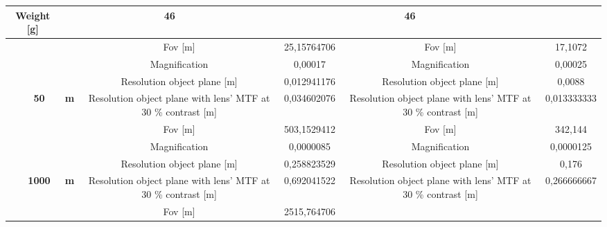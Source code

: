 \begin{table}[H]
{\begin{tabular}{ccc|cc|cc|}
  \multicolumn{2}{c|}{\textbf{Weight {[}g{]}}} &
  \multicolumn{2}{c|}{46} &
  \multicolumn{2}{c|}{46} \\ \hline
\multicolumn{1}{|c|}{} &
  \cellcolor[HTML]{EFEFEF} &
  \cellcolor[HTML]{EFEFEF} &
  \cellcolor[HTML]{EFEFEF}Fov {[}m{]} &
  \cellcolor[HTML]{EFEFEF}25,15764706 &
  \cellcolor[HTML]{EFEFEF}Fov {[}m{]} &
  \cellcolor[HTML]{EFEFEF}17,1072 \\
\multicolumn{1}{|c|}{} &
  \cellcolor[HTML]{EFEFEF} &
  \cellcolor[HTML]{EFEFEF} &
  Magnification &
  0,00017 &
  Magnification &
  0,00025 \\
\multicolumn{1}{|c|}{} &
  \cellcolor[HTML]{EFEFEF} &
  \cellcolor[HTML]{EFEFEF} &
  \cellcolor[HTML]{EFEFEF}Resolution object plane {[}m{]} &
  \cellcolor[HTML]{EFEFEF}0,012941176 &
  \cellcolor[HTML]{EFEFEF}Resolution object plane {[}m{]} &
  \cellcolor[HTML]{EFEFEF}0,0088 \\
\multicolumn{1}{|c|}{} &
  \multirow{-4}{*}{\cellcolor[HTML]{EFEFEF}\textbf{50}} &
  \multirow{-4}{*}{\cellcolor[HTML]{EFEFEF}\textbf{m}} &
  Resolution object plane with lens' MTF at 30 \% contrast {[}m{]} &
  0,034602076 &
  Resolution object plane with lens' MTF at 30 \% contrast {[}m{]} &
  0,013333333 \\ \cline{2-7} 
\multicolumn{1}{|c|}{} &
  \cellcolor[HTML]{EFEFEF} &
  \cellcolor[HTML]{EFEFEF} &
  \cellcolor[HTML]{EFEFEF}Fov {[}m{]} &
  \cellcolor[HTML]{EFEFEF}503,1529412 &
  \cellcolor[HTML]{EFEFEF}Fov {[}m{]} &
  \cellcolor[HTML]{EFEFEF}342,144 \\
\multicolumn{1}{|c|}{} &
  \cellcolor[HTML]{EFEFEF} &
  \cellcolor[HTML]{EFEFEF} &
  Magnification &
  0,0000085 &
  Magnification &
  0,0000125 \\
\multicolumn{1}{|c|}{} &
  \cellcolor[HTML]{EFEFEF} &
  \cellcolor[HTML]{EFEFEF} &
  \cellcolor[HTML]{EFEFEF}Resolution object plane {[}m{]} &
  \cellcolor[HTML]{EFEFEF}0,258823529 &
  \cellcolor[HTML]{EFEFEF}Resolution object plane {[}m{]} &
  \cellcolor[HTML]{EFEFEF}0,176 \\
\multicolumn{1}{|c|}{} &
  \multirow{-4}{*}{\cellcolor[HTML]{EFEFEF}\textbf{1000}} &
  \multirow{-4}{*}{\cellcolor[HTML]{EFEFEF}\textbf{m}} &
  Resolution object plane with lens' MTF at 30 \% contrast {[}m{]} &
  0,692041522 &
  Resolution object plane with lens' MTF at 30 \% contrast {[}m{]} &
  0,266666667 \\ \cline{2-7} 
\multicolumn{1}{|c|}{} &
  \cellcolor[HTML]{EFEFEF} &
  \cellcolor[HTML]{EFEFEF} &
  \cellcolor[HTML]{EFEFEF}Fov {[}m{]} &
  \cellcolor[HTML]{EFEFEF}2515,764706 &

\end{tabular}}
\end{table}
